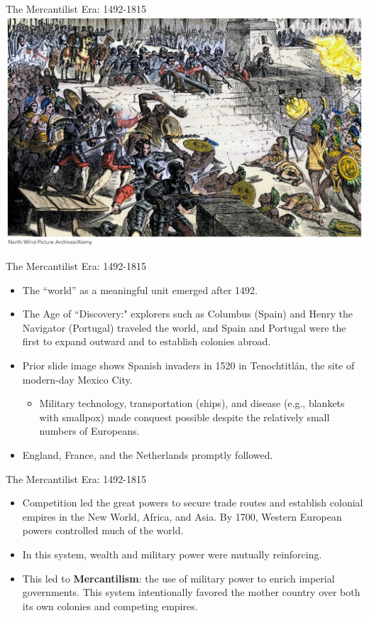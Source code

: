 \documentclass{beamer}
\begin{document}
\begin{frame}{\LARGE The Mercantilist Era: 1492-1815}
 \centering
\includegraphics[width=\textwidth,height=.9\textheight,keepaspectratio]{Conquistadors.jpg}	
\end{frame}

\begin{frame}{\LARGE The Mercantilist Era: 1492-1815}
	\begin{itemize}
		\item The ``world” as a meaningful unit emerged after 1492.
		\item The Age of ``Discovery:" explorers such as Columbus (Spain) and Henry the Navigator (Portugal) traveled the world, and Spain and Portugal were the first to expand outward and to establish colonies abroad. \pause
		\item Prior slide image shows Spanish invaders in 1520 in Tenochtitlán, the site of modern-day Mexico City.
		\begin{itemize}
			\item Military technology, transportation (ships), and disease (e.g., blankets with smallpox) made conquest possible despite the relatively small numbers of Europeans. \pause
		\end{itemize}
		\item England, France, and the Netherlands promptly followed. 
	\end{itemize}
\end{frame}

\begin{frame}{\LARGE The Mercantilist Era: 1492-1815}
	\begin{itemize}
		\item Competition led the great powers to secure trade routes and establish colonial empires in the New World, Africa, and Asia. By 1700, Western European powers controlled much of the world.
		\item In this system, wealth and military power were mutually reinforcing.
		\item This led to \textbf{Mercantilism}: the use of military power to enrich imperial governments. This system intentionally favored the mother country over both its own colonies and competing empires.
	\end{itemize}
\end{frame}
\end{document}
